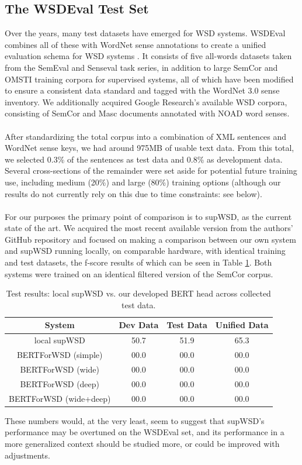 \documentclass{IEEEtran}
\begin{document}
\subsection{The WSDEval Test Set}
	Over the years, many test datasets have emerged for WSD systems. WSDEval combines all of these with WordNet sense annotations to create a unified evaluation schema for WSD systems \cite{wsdeval}. It consists of five all-words datasets taken from the SemEval and Senseval task series, in addition to large SemCor and OMSTI training corpora for supervised systems, all of which have been modified to ensure a consistent data standard and tagged with the WordNet 3.0 sense inventory. We additionally acquired Google Research's available WSD corpora, consisting of SemCor and Masc documents annotated with NOAD word senses.
	\\ \\
	After standardizing the total corpus into a combination of XML sentences and WordNet sense keys, we had around 975MB of usable text data. From this total, we selected 0.3\% of the sentences as test data and 0.8\% as development data. Several cross-sections of the remainder were set aside for potential future training use, including medium (20\%) and large (80\%) training options (although our results do not currently rely on this due to time constraints: see below).
	\\ \\
	For our purposes the primary point of comparison is to supWSD, as the current state of the art. We acquired the most recent available version from the authors' GitHub repository and focused on making a comparison between our own system and supWSD running locally, on comparable hardware, with identical training and test datasets, the f-score results of which can be seen in Table \ref{table:fscore1}. Both systems were trained on an identical filtered version of the SemCor corpus.
	\begin{table}[h]
		\centering
		\begin{tabular}{|c|ccc|}
			System & Dev Data & Test Data & Unified Data \\
			\hline
			local supWSD & 50.7 & 51.9 & 65.3 \\
			BERTForWSD (simple) & 00.0 & 00.0 & 00.0 \\
			BERTForWSD (wide) & 00.0 & 00.0 & 00.0 \\
			BERTForWSD (deep) & 00.0 & 00.0 & 00.0 \\
			BERTForWSD (wide+deep) & 00.0 & 00.0 & 00.0
		\end{tabular}
		\caption{Test results: local supWSD vs. our developed BERT head across collected test data.}
		\label{table:fscore1}
	\end{table}
	These numbers would, at the very least, seem to suggest that supWSD's performance may be overtuned on the WSDEval set, and its performance in a more generalized context should be studied more, or could be improved with adjustments. 
\end{document}

